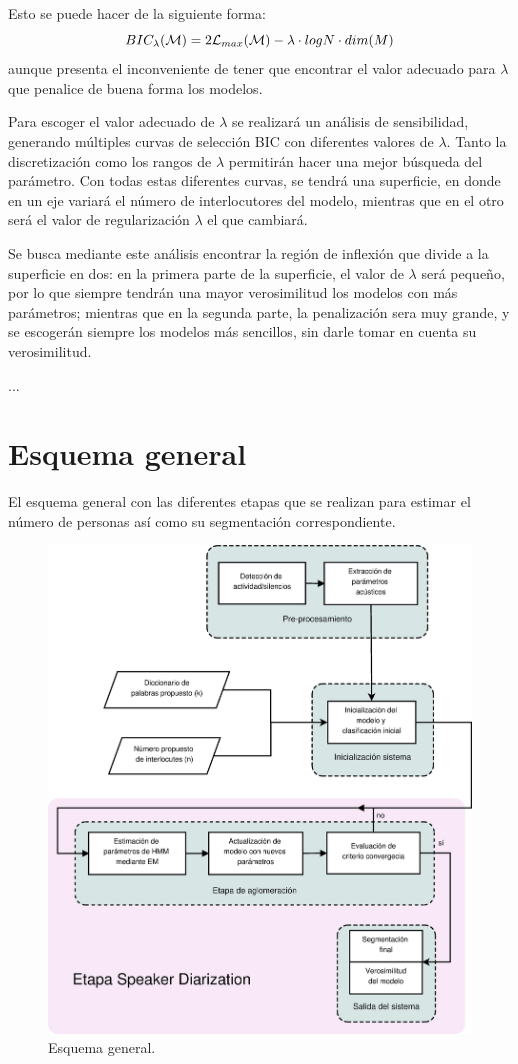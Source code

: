 Esto se puede hacer de la siguiente forma: 
\begin{equation}
BIC_{\lambda}(\mathcal{M}) = 2 \mathcal{L}_{max}(\mathcal{M}) - \lambda \cdot log N \cdot dim(M)
\end{equation}
aunque presenta el inconveniente de tener que encontrar el valor adecuado para $\lambda$ que penalice de buena forma los modelos. 

Para escoger el valor adecuado de $\lambda$ se realizará un análisis de sensibilidad, generando múltiples curvas de selección \ac{BIC} con diferentes valores de $\lambda$. Tanto la discretización como los rangos de $\lambda$ permitirán hacer una mejor búsqueda del parámetro. Con todas estas diferentes curvas, se tendrá una superficie, en donde en un eje variará el número de interlocutores del modelo, mientras que en el otro será el valor de regularización $\lambda$ el que cambiará. 

Se busca mediante este análisis encontrar la región de inflexión que divide a la superficie en dos: en la primera parte de la superficie, el valor de $\lambda$ será pequeño, por lo que siempre tendrán una mayor verosimilitud los modelos con más parámetros; mientras que en la segunda parte, la penalización sera muy grande, y se escogerán siempre los modelos más sencillos, sin darle tomar en cuenta su verosimilitud.

...

\section{Esquema general} 

El esquema general con las diferentes etapas que se realizan para estimar el número de personas así como su segmentación correspondiente.

\begin{figure}[bth]
  \centerline
  {\includegraphics[width=1.5\linewidth]{gfx/chap5/general_flow}} \quad
  \caption{Esquema general.}
  \label{fig:esquema}
\end{figure}